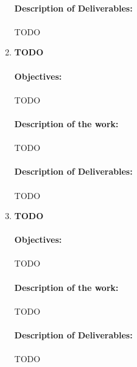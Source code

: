 \documentclass{article}
\begin{document}
\begin{enumerate}[label=\textbf{WP\arabic*:}]
\paragraph{Description of Deliverables:} \paragraph{}
TODO

\newpage
\item \textbf{TODO}
\paragraph{Objectives:} \paragraph{}
TODO
\paragraph{Description of the work:} \paragraph{}
TODO
\paragraph{Description of Deliverables:} \paragraph{}
TODO

\newpage
\item \textbf{TODO}
\paragraph{Objectives:} \paragraph{}
TODO
\paragraph{Description of the work:} \paragraph{}
TODO
\paragraph{Description of Deliverables:} \paragraph{}
TODO


\end{enumerate}
\end{document}
